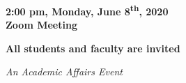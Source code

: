 \documentclass{article}
\begin{document}
\hfill\break

\begin{center}

\LARGE
{\bf 2:00 pm, Monday, June 8\textsuperscript{th}, 2020\\
Zoom Meeting}\\

\vspace{15mm}

\large
{\bf All students and faculty are invited}\\

\hfill\break

\small
{\it An Academic Affairs Event}

\end{center}
\end{document}

